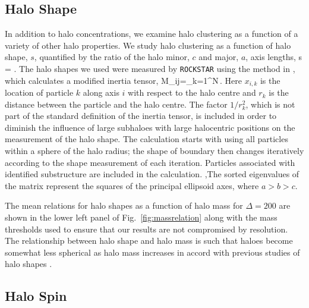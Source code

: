 \documentclass[usenatbib,fleqn]{mnras}
\begin{document}
\subsection{Halo Shape}

In addition to halo concentrations, we examine halo clustering as a function of a variety of other halo properties. We study halo clustering as a function of halo shape, $s$, quantified by the ratio of the halo minor, $c$ and major, $a$, axis lengths, 
%
\beq
s = .
\eeq
%
The halo shapes we used were measured by {\tt ROCKSTAR} using the method in \cite{allgood_etal06}, which calculates a modified inertia tensor,
\beq
M_{ij}=\sum\limits_{k=1}^{N}\,.
\eeq
Here $x_{i,k}$ is the location of particle $k$ along axis $i$ with respect to the halo centre and $r_{k}$ is the distance between the particle and the halo centre. The factor $1/r_{k}^2$, which is not part of the standard definition of the inertia tensor, is included in order to diminish the influence of large subhaloes with large halocentric positions on the measurement of the halo shape. The calculation starts with using all particles within a sphere of the halo radius; the shape of boundary then changes iteratively according to the shape measurement of each iteration. Particles associated with identified substructure are included in the calculation. ,The sorted eigenvalues of the matrix represent the squares of the principal ellipsoid axes, where $a > b > c$. 
%
%
%

The mean relations for halo shapes as a function of halo mass for $\Delta=200$ are shown in the lower left panel of Fig.~\ref{fig:massrelation} along with the mass thresholds used to ensure that our results are not compromised by resolution. The relationship between halo shape and halo mass is such that haloes become somewhat less spherical as halo mass increases in accord with previous studies of halo shapes \citep[e.g.,][]{jing_suto02,allgood_etal06}.

\subsection{Halo Spin}
\end{document}
